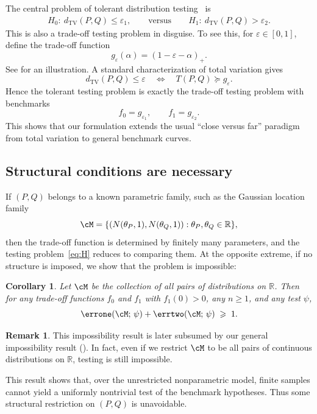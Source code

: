 \documentclass[english]{article}
\theoremstyle{plain}
\newtheorem{corollary}{Corollary}[section]
\theoremstyle{definition}
\newtheorem{remark}{Remark}[section]
\newcommand{\Toff}[2]{T(#1,#2)}
\newcommand{\fnull}{f_0}
\newcommand{\falt}{f_1}
\begin{document}
The central problem of tolerant distribution testing~\cite{price2021tolerant} is
\begin{align}\label{eq:tolerant-testing}
H_0:\ d_{\mathrm{TV}}(P,Q)\leqslant \varepsilon_1, \qquad \text{versus} \qquad
H_1:\ d_{\mathrm{TV}}(P,Q)>\varepsilon_2.
\end{align}
This is also a trade-off testing problem in disguise.
To see this, for $\varepsilon\in[0,1]$, define the trade-off function
\[
g_\varepsilon(\alpha)=(1-\varepsilon-\alpha)_+.
\]
See  for an illustration. A standard
characterization of total variation gives
\[
d_{\mathrm{TV}}(P,Q)\leqslant \varepsilon
\quad\Longleftrightarrow\quad
\Toff{P}{Q}\succeq g_\varepsilon.
\]
Hence the tolerant testing problem is exactly the trade-off testing problem
with benchmarks
\[
\fnull=g_{\varepsilon_1},
\qquad
\falt=g_{\varepsilon_2}.
\]
This shows that our formulation extends the usual ``close versus far''
paradigm from total variation to general benchmark curves.

\subsection{Structural conditions are necessary}

If $(P,Q)$ belongs to a known parametric family, such as the Gaussian location family
\[
\cM = \{(N(\theta_P, 1), N(\theta_Q, 1)) : \theta_P, \theta_Q \in \mathbb{R}\},
\]
then the trade-off function is determined by finitely many parameters, and the
testing problem~\eqref{eq:H} reduces to comparing them. At the opposite
extreme, if no structure is imposed, we show that the problem is impossible:

\begin{corollary}\label{cor:impossibility}
Let $\cM$ be the collection of all pairs of distributions on $\mathbb{R}$.
Then for any trade-off functions $\fnull$ and $\falt$ with $\falt(0) > 0$, any
$n \geqslant 1$, and any test $\psi$,
\[
\errone(\cM;\, \psi) + \errtwo(\cM;\, \psi) \;\geqslant\; 1.
\]
\end{corollary}

\begin{remark}
  This impossibility result is later subsumed by our general impossibility result (). In fact, even if we restrict $\cM$ to be all pairs of continuous distributions on $\mathbb{R}$, testing is still impossible.  
\end{remark} 

This result shows that, over the unrestricted nonparametric model, finite
samples cannot yield a uniformly nontrivial test of the benchmark hypotheses.
Thus some structural restriction on $(P,Q)$ is unavoidable.
\end{document}
